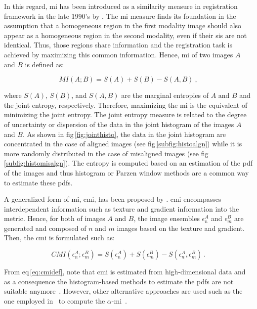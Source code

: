 In this regard, \ac{mi} has been introduced as a similarity measure in registration framework in the late 1990's by \citeauthor{Pluim2003}.
The \ac{mi} measure finds its foundation in the assumption that a homogeneous region in the first modality image should also appear as a homogeneous region in the second modality, even if their \acp{si} are not identical.
Thus, those regions share information and the registration task is achieved by maximizing this common information.
Hence, \Ac{mi} of two images $A$ and $B$ is defined as:

\begin{equation}
	MI(A;B) = S(A) + S(B) - S(A,B) \ ,
	\label{eq:midef}
\end{equation}

\noindent where $S(A)$, $S(B)$, and $S(A,B)$ are the marginal entropies of $A$ and $B$ and the joint entropy, respectively.
Therefore, maximizing the \ac{mi} is the equivalent of minimizing the joint entropy. 
The joint entropy measure is related to the degree of uncertainty or dispersion of the data in the joint histogram of the images $A$ and $B$.
As shown in \acs{fig}\,\ref{fig:jointhisto}, the data in the joint histogram are concentrated in the case of aligned images (see \acs{fig}\,\ref{subfig:histoalgn}) while it is more randomly distributed in the case of misaligned images (see \acs{fig}\,\ref{subfig:histomisalgn}).
The entropy is computed based on an estimation of the \ac{pdf} of the images and thus histogram or Parzen window methods are a common way to estimate these \acp{pdf}.

A generalized form of \ac{mi}, \ac{cmi}, has been proposed by \citeauthor{Chappelow2011}.
\ac{cmi} encompasses interdependent information such as texture and gradient information into the metric.
Hence, for both of images $A$ and $B$, the image ensembles $\epsilon^{A}_n$ and $\epsilon^{B}_m$ are generated and composed of $n$ and $m$ images based on the texture and gradient.
Then, the \ac{cmi} is formulated such as:

\begin{equation}
	CMI(\epsilon^{A}_n;\epsilon^{B}_m) = S(\epsilon^{A}_n) + S(\epsilon^{B}_m) - S(\epsilon^{A}_n,\epsilon^{B}_m) \ .
	\label{eq:cmidef}
\end{equation}

From \acs{eq}\,\eqref{eq:cmidef}, note that \ac{cmi} is estimated from high-dimensional data and as a consequence the histogram-based methods to estimate the \acp{pdf} are not suitable anymore~\cite{Chappelow2011}. 
However, other alternative approaches are used such as the one employed in~\cite{Staring2009} to compute the $\alpha$-\ac{mi}~\cite{Hero2002}.

